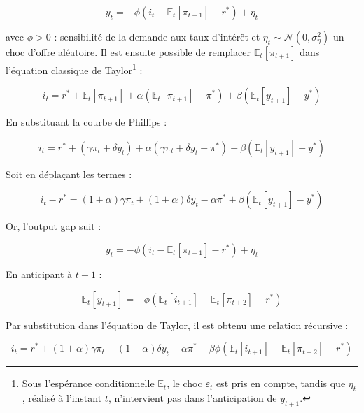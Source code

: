 \begin{equation}
y_t = -\phi (i_t - \mathbb{E}_t [\pi_{t+1}] - r^*) + \eta_t
\end{equation}

avec \( \phi > 0 \) : sensibilité de la demande aux taux d’intérêt et \( \eta_t \sim \mathcal{N}(0, \sigma_\eta^2) \) un choc d’offre aléatoire. Il est ensuite possible de remplacer \( \mathbb{E}_t [\pi_{t+1}] \) dans l’équation classique de Taylor\footnote{Sous l'espérance conditionnelle $\mathbb{E}_t$, le choc $\varepsilon_t$ est pris en compte, tandis que $\eta_t$, réalisé à l'instant $t$, n'intervient pas dans l'anticipation de $y_{t+1}$.} :

\begin{equation}
i_t = r^* + \mathbb{E}_t [\pi_{t+1}] + \alpha (\mathbb{E}_t [\pi_{t+1}] - \pi^*) + \beta (\mathbb{E}_t [y_{t+1}] - y^*)
\end{equation}

En substituant la courbe de Phillips :

\begin{equation}
i_t = r^* + (\gamma \pi_t + \delta y_t) + \alpha (\gamma \pi_t + \delta y_t - \pi^*) + \beta (\mathbb{E}_t [y_{t+1}] - y^*)  
\end{equation}

Soit en déplaçant les termes :

\begin{equation}
i_t - r^* = (1 + \alpha) \gamma \pi_t + (1 + \alpha) \delta y_t - \alpha \pi^* + \beta (\mathbb{E}_t [y_{t+1}] - y^*)
\end{equation}

Or, l’output gap suit :

\begin{equation}
y_t = -\phi (i_t - \mathbb{E}_t [\pi_{t+1}] - r^*) + \eta_t
\end{equation}

En anticipant à \( t+1 \) :

\begin{equation}
\mathbb{E}_t [y_{t+1}] = -\phi (\mathbb{E}_t [i_{t+1}] - \mathbb{E}_t [\pi_{t+2}] - r^*)
\end{equation}

Par substitution dans l’équation de Taylor, il est obtenu une relation récursive :

\begin{equation}
i_t = r^* + (1+\alpha) \gamma \pi_t + (1+\alpha) \delta y_t - \alpha \pi^* - \beta \phi (\mathbb{E}_t [i_{t+1}] - \mathbb{E}_t [\pi_{t+2}] - r^*)
\end{equation}

